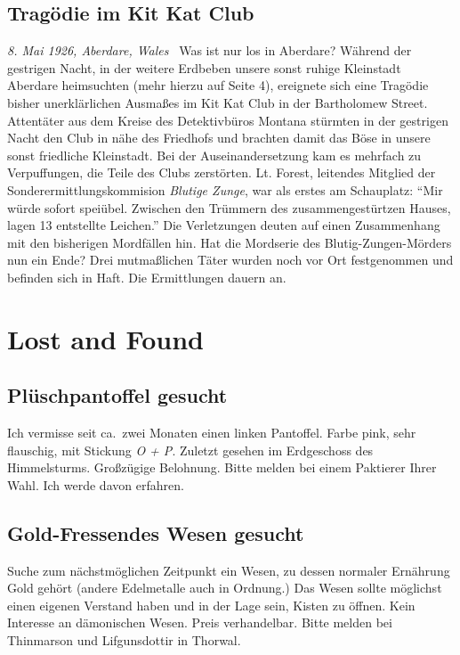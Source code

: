 \documentclass[final]{multiversum}
\begin{document}
\begin{tikzpicture}

\end{tikzpicture} 

\subsection{Tragödie im Kit Kat Club}
\textit{8. Mai 1926, Aberdare, Wales} \textendash\ Was ist nur los in Aberdare?
Während der gestrigen Nacht, in der weitere Erdbeben unsere sonst ruhige
Kleinstadt Aberdare heimsuchten (mehr hierzu auf Seite 4), ereignete sich eine
Tragödie bisher unerklärlichen Ausmaßes im Kit Kat Club in der Bartholomew
Street. Attentäter aus dem Kreise des Detektivbüros Montana stürmten in der
gestrigen Nacht den Club in nähe des Friedhofs und brachten damit das Böse in
unsere sonst friedliche Kleinstadt. Bei der Auseinandersetzung kam es mehrfach
zu Verpuffungen, die Teile des Clubs zerstörten. Lt. Forest, leitendes Mitglied
der Sonderermittlungskommision \emph{Blutige Zunge}, war als erstes am
Schauplatz: \enquote{Mir würde sofort speiübel. Zwischen den Trümmern des
zusammengestürtzen Hauses, lagen 13 entstellte Leichen.} Die Verletzungen deuten
auf einen Zusammenhang mit den bisherigen Mordfällen hin. Hat die Mordserie des
Blutig-Zungen-Mörders nun ein Ende? Drei mutmaßlichen Täter wurden noch vor Ort
festgenommen und befinden sich in Haft. Die Ermittlungen dauern an.


\section{Lost and Found}
\subsection{Plüschpantoffel gesucht}
Ich vermisse seit ca.\ zwei Monaten einen linken Pantoffel.  Farbe pink, sehr
flauschig, mit Stickung \emph{O + P}.  Zuletzt gesehen im Erdgeschoss des
Himmelsturms.  Großzügige Belohnung.  Bitte melden bei einem Paktierer Ihrer Wahl.
Ich werde davon erfahren.

\subsection{Gold-Fressendes Wesen gesucht}
Suche zum nächstmöglichen Zeitpunkt ein Wesen, zu dessen normaler Ernährung Gold
gehört (andere Edelmetalle auch in Ordnung.) Das Wesen sollte möglichst einen
eigenen Verstand haben und in der Lage sein, Kisten zu öffnen.  Kein Interesse
an dämonischen Wesen.  Preis verhandelbar.  Bitte melden bei Thinmarson und
Lifgunsdottir in Thorwal.
\end{document}
